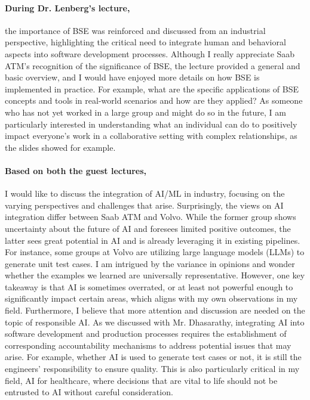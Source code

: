 \documentclass[11pt]{article}
\begin{document}
\paragraph{During Dr. Lenberg's lecture,} the importance of BSE was reinforced and discussed from an industrial perspective, highlighting the critical need to integrate human and behavioral aspects into software development processes.
Although I really appreciate Saab ATM's recognition of the significance of BSE, the lecture provided a general and basic overview, and I would have enjoyed more details on how BSE is implemented in practice.
For example, what are the specific applications of BSE concepts and tools in real-world scenarios and how are they applied?
As someone who has not yet worked in a large group and might do so in the future, I am particularly interested in understanding what an individual can do to positively impact everyone's work in a collaborative setting with complex relationships, as the slides showed for example. 

\paragraph{Based on both the guest lectures,}  I would like to discuss the integration of AI/ML in industry, focusing on the varying perspectives and challenges that arise.
Surprisingly, the views on AI integration differ between Saab ATM and Volvo. 
While the former group shows uncertainty about the future of AI and foresees limited positive outcomes, the latter sees great potential in AI and is already leveraging it in existing pipelines. 
For instance, some groups at Volvo are utilizing large language models (LLMs) to generate unit test cases.
I am intrigued by the variance in opinions and wonder whether the examples we learned are universally representative. 
However, one key takeaway is that AI is sometimes overrated, or at least not powerful enough to significantly impact certain areas, which aligns with my own observations in my field.
Furthermore, I believe that more attention and discussion are needed on the topic of responsible AI. 
As we discussed with Mr. Dhasarathy, integrating AI into software development and production processes requires the establishment of corresponding accountability mechanisms to address potential issues that may arise. 
For example, whether AI is used to generate test cases or not, it is still the engineers' responsibility to ensure quality. 
This is also particularly critical in my field, AI for healthcare, where decisions that are vital to life should not be entrusted to AI without careful consideration.
\end{document}
